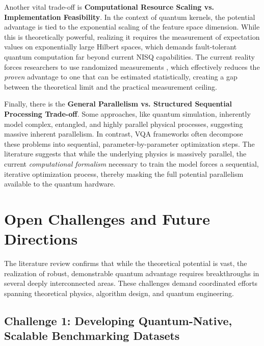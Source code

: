 \documentclass{article}
\begin{document}
Another vital trade-off is \textbf{Computational Resource Scaling vs. Implementation Feasibility}. In the context of quantum kernels, the potential advantage is tied to the exponential scaling of the feature space dimension. While this is theoretically powerful, realizing it requires the measurement of expectation values on exponentially large Hilbert spaces, which demands fault-tolerant quantum computation far beyond current NISQ capabilities. The current reality forces researchers to use randomized measurements \cite{haug2023quantum}, which effectively reduces the \textit{proven} advantage to one that can be estimated statistically, creating a gap between the theoretical limit and the practical measurement ceiling.

Finally, there is the \textbf{General Parallelism vs. Structured Sequential Processing Trade-off}. Some approaches, like quantum simulation, inherently model complex, entangled, and highly parallel physical processes, suggesting massive inherent parallelism. In contrast, VQA frameworks often decompose these problems into sequential, parameter-by-parameter optimization steps. The literature suggests that while the underlying physics is massively parallel, the current \textit{computational formalism} necessary to train the model forces a sequential, iterative optimization process, thereby masking the full potential parallelism available to the quantum hardware.

\section{Open Challenges and Future Directions}

\label{sec:open\_challenges\_and\_future\_directions}

The literature review confirms that while the theoretical potential is vast, the realization of robust, demonstrable quantum advantage requires breakthroughs in several deeply interconnected areas. These challenges demand coordinated efforts spanning theoretical physics, algorithm design, and quantum engineering.

\subsection{Challenge 1: Developing Quantum-Native, Scalable Benchmarking Datasets}

\label{sec:challenge_1\_developing\_quantum\_native\_sc}
\end{document}
